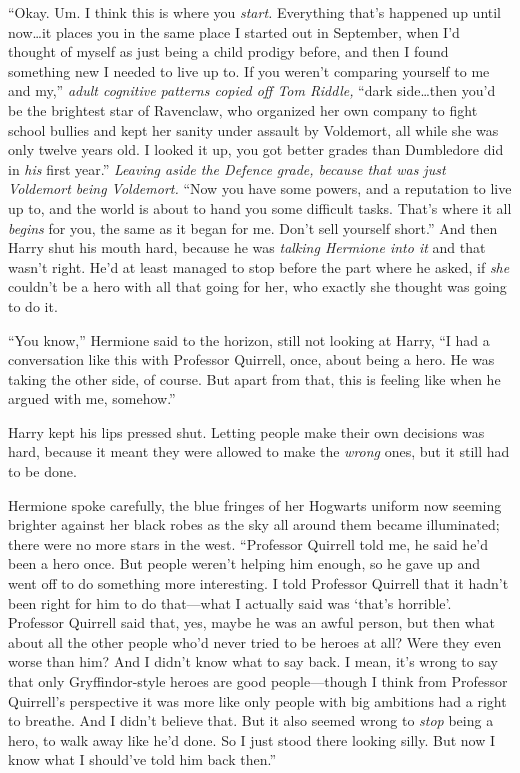 “Okay. Um. I think this is where you \emph{start.} Everything that’s happened up until now…it places you in the same place I started out in September, when I’d thought of myself as just being a child prodigy before, and then I found something new I needed to live up to. If you weren’t comparing yourself to me and my,” \emph{adult cognitive patterns copied off Tom Riddle,} “dark side…then you’d be the brightest star of Ravenclaw, who organized her own company to fight school bullies and kept her sanity under assault by Voldemort, all while she was only twelve years old. I looked it up, you got better grades than Dumbledore did in \emph{his} first year.” \emph{Leaving aside the Defence grade, because that was just Voldemort being Voldemort.} “Now you have some powers, and a reputation to live up to, and the world is about to hand you some difficult tasks. That’s where it all \emph{begins} for you, the same as it began for me. Don’t sell yourself short.” And then Harry shut his mouth hard, because he was \emph{talking Hermione into it} and that wasn’t right. He’d at least managed to stop before the part where he asked, if \emph{she} couldn’t be a hero with all that going for her, who exactly she thought was going to do it.

“You know,” Hermione said to the horizon, still not looking at Harry, “I had a conversation like this with Professor Quirrell, once, about being a hero. He was taking the other side, of course. But apart from that, this is feeling like when he argued with me, somehow.”

Harry kept his lips pressed shut. Letting people make their own decisions was hard, because it meant they were allowed to make the \emph{wrong} ones, but it still had to be done.

Hermione spoke carefully, the blue fringes of her Hogwarts uniform now seeming brighter against her black robes as the sky all around them became illuminated; there were no more stars in the west. “Professor Quirrell told me, he said he’d been a hero once. But people weren’t helping him enough, so he gave up and went off to do something more interesting. I told Professor Quirrell that it hadn’t been right for him to do that—what I actually said was ‘that’s horrible’. Professor Quirrell said that, yes, maybe he was an awful person, but then what about all the other people who’d never tried to be heroes at all? Were they even worse than him? And I didn’t know what to say back. I mean, it’s wrong to say that only Gryffindor-style heroes are good people—though I think from Professor Quirrell’s perspective it was more like only people with big ambitions had a right to breathe. And I didn’t believe that. But it also seemed wrong to \emph{stop} being a hero, to walk away like he’d done. So I just stood there looking silly. But now I know what I should’ve told him back then.”

